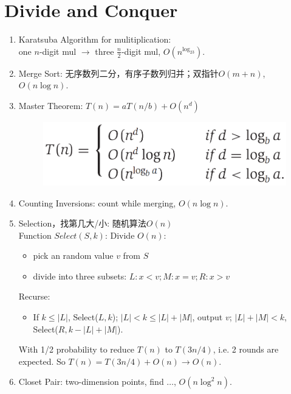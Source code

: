 \documentclass[10pt, a4paper, twocolumn]{article}
\begin{document}
\section{Divide and Conquer}
\begin{enumerate}[leftmargin = 12pt, topsep = 0pt, itemsep=0pt, partopsep = 0pt]
    \item Karatsuba Algorithm for mulitiplication: \\one $n$-digit mul $\to$ three $\frac{n}{2}$-digit mul, $O(n^{\log_23})$.
    \item Merge Sort: 无序数列二分，有序子数列归并；双指针$O(m+n)$, $O(n\log n)$.
    \item Master Theorem: $T(n) = aT(n/b) + O(n^d)$
    \begin{figure}[htbp] %
    \centering
    \includegraphics[scale=0.4]{pic/2_1.png}
    \end{figure}
    \vspace{-0.3cm}
    \item Counting Inversions: count while merging, $O(n\log n)$.
    \item Selection，找第几大/小: 随机算法$O(n)$\\
        Function $Select(S,k)$: Divide $O(n)$:
        \begin{itemize}[leftmargin = 12pt, topsep = 0pt, itemsep=0pt, partopsep = 0pt]
        \item pick an random value $v$ from $S$
        \item divide into three subsets: $L: x<v; M: x=v; R: x>v$
        \end{itemize}
        Recurse:
        \begin{itemize}[leftmargin = 12pt, topsep = 0pt, itemsep=0pt, partopsep = 0pt]
        \item If $k\leq |L|$, Select($L,k$); $|L|<k\leq |L|+|M|$, output $v$; $|L|+|M| < k$, Select($R, k-|L|+|M|$).
        \end{itemize}
        With 1/2 probability to reduce $T(n)$ to $T(3n/4)$, i.e. 2 rounds are expected. So $T(n) = T(3n/4) + O(n)\to O(n)$.
        \item Closet Pair: two-dimension points, find $\dots$, $O(n\log^2 n).$\\

\end{enumerate}
\end{document}
